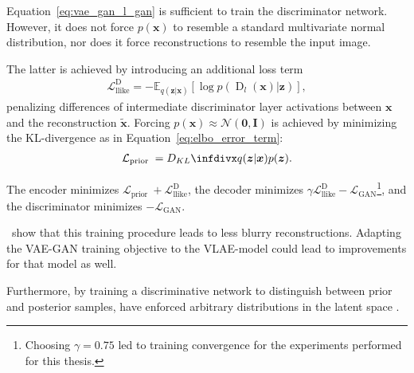 Equation~\ref{eq:vae_gan_l_gan} is sufficient to train the discriminator network.
However, it does not force $p(\bm{x})$ to resemble a standard multivariate normal distribution, nor does it force reconstructions to resemble the input image.

The latter is achieved by introducing an additional loss term
\begin{align}
    \mathcal{L}_{\text {llike}}^{\text {D}}=-\mathbb{E}_{q(\bm{z} | \bm{x})}\left[\log p\left(\operatorname{D}_{l}(\bm{x}) | \bm{z}\right)\right],
\end{align}
penalizing differences of intermediate discriminator layer activations between $\bm{x}$ and the reconstruction $\tilde{\bm{x}}$.
Forcing $p(\bm{x}) \approx \mathcal{N}(\bm{0},\bm{I})$ is achieved by minimizing the \ac{KL}-divergence as in Equation~\ref{eq:elbo_error_term}:
\begin{align}
    \mathcal{L}_{\text {prior }}=\kldiv{q(\boldsymbol{z} | \boldsymbol{x})}{p(\boldsymbol{z})}.
\end{align}

The encoder minimizes $\mathcal{L}_{\text {prior }} +  \mathcal{L}_{\text {llike}}^{\text {D}}$, the decoder minimizes $\gamma \mathcal{L}_{\text {llike}}^{\text {D}} - \mathcal{L}_\mathrm{GAN}$\footnote{Choosing $\gamma = 0.75$ led to training convergence for the experiments performed for this thesis.}, and the discriminator minimizes $-\mathcal{L}_\mathrm{GAN}$.

\citet{larsen2015autoencoding}~show that this training procedure leads to less blurry reconstructions.
Adapting the \ac{VAE}-\ac{GAN} training objective to the \ac{VLAE}-model could lead to improvements for that model as well.

Furthermore, by training a discriminative network to distinguish between prior and posterior samples, \citet{makhzani2016adversarial} have enforced arbitrary distributions in the latent space .

